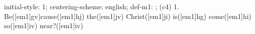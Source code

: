 initial-style: 1;
centering-scheme: english;
def-m1: \grealign;
(c4) 1. Be([em1]gv)cause([em1]hj) the([em1]jv) Christ([em1]ji) is([em1]hg) come([em1]hi) so([em1]iv) near?([em1]iv)
